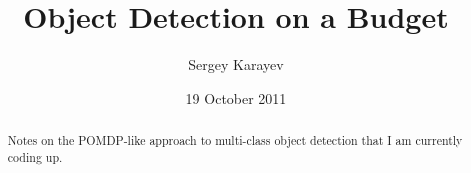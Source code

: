 \documentclass[10pt]{article}
\title{Object Detection on a Budget}
\author{Sergey Karayev}
\date{19 October 2011}
\begin{document}
\maketitle

\begin{abstract}
Notes on the POMDP-like approach to multi-class object detection that I am currently coding up.
\end{abstract}




\small

\end{document}
